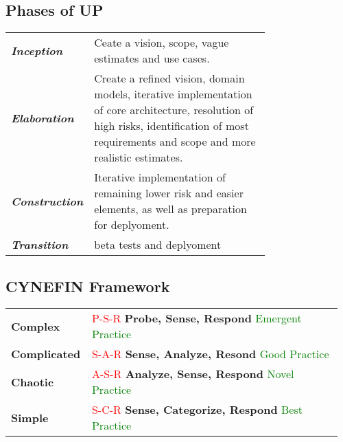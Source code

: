 \documentclass[main.tex,fontsize=8pt,paper=a4,paper=portrait,DIV=calc,]{scrartcl}
\begin{document}
\begin{table}[h!]
\subsection{Phases of UP}
\begin{tabular}{|m{0,205\linewidth}|m{0.75\linewidth}|}
\hline
\textbf{\emph{Inception}} & Ceate a vision, scope, vague estimates and use cases.\\
\textbf{\emph{Elaboration}} & Create a refined vision, domain models, iterative implementation of core architecture, resolution of high risks, identification of most requirements and scope and more realistic estimates.\\
\textbf{\emph{Construction}} & Iterative implementation of remaining lower risk and easier elements, as well as preparation for deplyoment.\\
\textbf{\emph{Transition}} &beta tests and deplyoment \\
\hline
\end{tabular}
\subsection{CYNEFIN Framework}
\begin{tabular}{|m{0.2\linewidth}|m{0.755\linewidth}|}
\hline
\textbf{Complex} & 
\textcolor{red}{P-S-R}\newline
\textbf{Probe, Sense, Respond}\newline
\textcolor{green}{Emergent Practice}\\
\textbf{Complicated} & 
\textcolor{red}{S-A-R}\newline
\textbf{Sense, Analyze, Resond}\newline
\textcolor{green}{Good Practice}\\
\textbf{Chaotic} & 
\textcolor{red}{A-S-R}\newline
\textbf{Analyze, Sense, Respond}\newline
\textcolor{green}{Novel Practice}\\
\textbf{Simple} & 
\textcolor{red}{S-C-R}\newline
\textbf{Sense, Categorize, Respond}\newline
\textcolor{green}{Best Practice}\\
\hline
\end{tabular}

\end{table}
\end{document}
